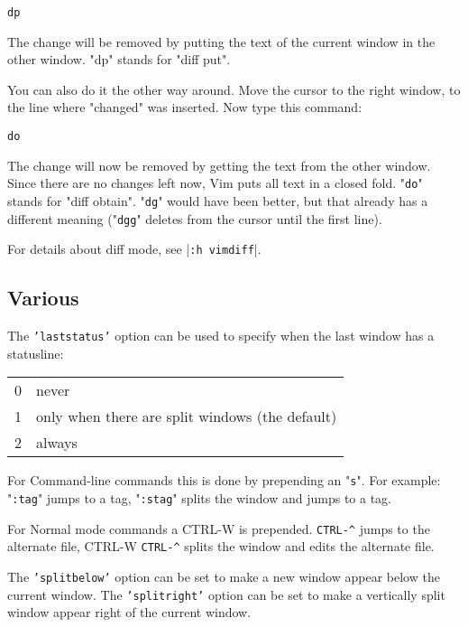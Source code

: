  \begin{Verbatim}[samepage=true]
 dp
 \end{Verbatim}

The change will be removed by putting the text of the current window in the other window.
"dp" stands for "diff put".

You can also do it the other way around.
Move the cursor to the right window, to the line where "changed" was inserted.
Now type this command:

 \begin{Verbatim}[samepage=true]
 do
 \end{Verbatim}

The change will now be removed by getting the text from the other window.
Since there are no changes left now, Vim puts all text in a closed fold.
"\texttt{do}" stands for "diff obtain".
"\texttt{dg}" would have been better, but that already has a different meaning ("\texttt{dgg}" deletes from the cursor until the first line).

For details about diff mode, see |\texttt{:h vimdiff}|.
\subsection{Various}
The \texttt{'laststatus'} option can be used to specify when the last window has a statusline:

\begin{center}
				\begin{longtable}{c l}
								0 & never\\
								1 & only when there are split windows (the default)\\
								2 & always\\
				\end{longtable}
\end{center}

For Command-line commands this is done by prepending an "\texttt{s}".
For example: "\texttt{:tag}" jumps to a tag, "\texttt{:stag}" splits the window and jumps to a tag.

For Normal mode commands a CTRL-W is prepended.
\texttt{CTRL-\^{}} jumps to the alternate file, CTRL-W \texttt{CTRL-\^{}} splits the window and edits the alternate file.

The \texttt{'splitbelow'} option can be set to make a new window appear below the current window.
The \texttt{'splitright'} option can be set to make a vertically split window appear right of the current window.

